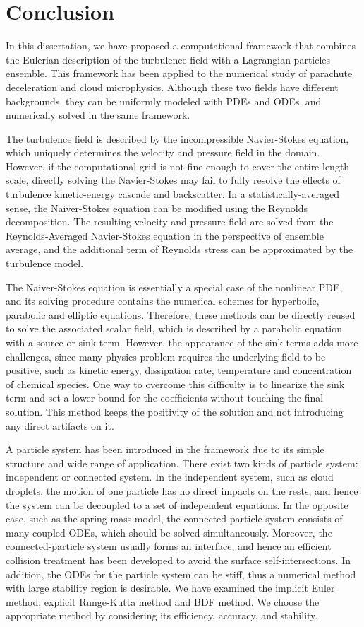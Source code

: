 \chapter{Conclusion}
In this dissertation, we have proposed a computational framework that combines the Eulerian 
description of the turbulence field with a Lagrangian particles ensemble. 
This framework has been applied to the numerical study of parachute deceleration and 
cloud microphysics. Although these two fields have different backgrounds, they can be uniformly  
modeled with PDEs and ODEs, and numerically solved in the same framework.

The turbulence field is described by the incompressible Navier-Stokes equation, which uniquely 
determines the velocity and pressure field in the domain. However, if the computational grid is not 
fine enough to cover the entire length scale, directly solving the Navier-Stokes may fail 
to fully resolve the effects of turbulence kinetic-energy cascade and backscatter. In a statistically-averaged sense, the Naiver-Stokes equation can be modified using the Reynolds decomposition. The resulting velocity and pressure field are solved from the Reynolds-Averaged Navier-Stokes equation in the perspective of ensemble average, and the additional term of Reynolds stress can be approximated by the turbulence model. 

The Naiver-Stokes equation is essentially a special case of the nonlinear PDE, and its solving procedure contains the numerical schemes for hyperbolic, parabolic and elliptic equations. Therefore, these methods can be directly reused to solve the associated scalar field, which is described by a parabolic equation with a source or sink term. However, the appearance of the sink terms adds more challenges, since many physics problem requires the underlying field to be positive, such as kinetic energy, dissipation rate, temperature and concentration of chemical species. One way to overcome this difficulty is to linearize the sink term and set a lower bound for the coefficients without touching the final solution. This method keeps the positivity of the solution and not introducing any direct artifacts on it.

A particle system has been introduced in the framework due to its simple structure and wide range of application. There exist two kinds of particle system: independent or connected system. In the independent system, such as cloud droplets, the motion of one particle has no direct impacts on the rests, and hence the system can be decoupled to a set of independent equations. In the opposite case, such as the spring-mass model, the connected particle system consists of many coupled ODEs, which should be solved simultaneously. Moreover, the connected-particle system usually forms an interface, and hence an efficient collision treatment has been developed to avoid the surface self-intersections. In addition, the ODEs for the particle system can be stiff, thus a numerical method 
with large stability region is desirable. We have examined the implicit Euler method, explicit Runge-Kutta method and BDF method. We choose the appropriate method by considering its efficiency, 
accuracy, and stability.   


